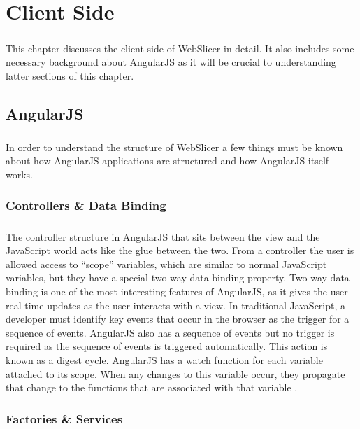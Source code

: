 \chapter{Client Side}
\paragraph{}
This chapter discusses the client side of WebSlicer in detail. 
It also includes some necessary background about AngularJS as it will be crucial to understanding latter sections of this chapter.

\section{AngularJS}
\paragraph{}
In order to understand the structure of WebSlicer a few things must be known about how AngularJS applications are structured and how AngularJS itself works.
\subsection{Controllers \& Data Binding}
\paragraph{}
The controller structure in AngularJS that sits between the view and the JavaScript world acts like the glue between the two.
From a controller the user is allowed access to ``scope'' variables, which are similar to normal JavaScript variables, but they have a special two-way data binding property.
Two-way data binding is one of the most interesting features of AngularJS, as it gives the user real time updates as the user interacts with a view.
In traditional JavaScript, a developer must identify key events that occur in the browser as the trigger for a sequence of events.
AngularJS also has a sequence of events but no trigger is required as the sequence of events is triggered automatically.
This action is known as a digest cycle.
AngularJS has a watch function for each variable attached to its scope.
When any changes to this variable occur, they propagate that change to the functions that are associated with that variable \citep{freeman-2014}.

\subsection{Factories \& Services}
